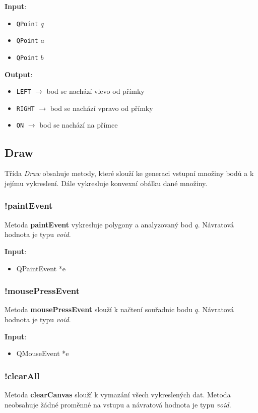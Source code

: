 \documentclass[a4paper, 12pt]{article}
\begin{document}
\textbf{Input}:
\begin{itemize}
\item \texttt{QPoint} $q$
\item \texttt{QPoint} $a$
\item \texttt{QPoint} $b$
\end{itemize}

\textbf{Output}:
\begin{itemize}
\item \texttt{LEFT} $\rightarrow$ bod se nachází vlevo od přímky
\item \texttt{RIGHT} $\rightarrow$ bod se nachází vpravo od přímky
\item \texttt{ON} $\rightarrow$ bod se nachází na přímce
\end{itemize}

\subsection{Draw}
Třída \textit{Draw} obsahuje metody, které slouží ke generaci vstupní množiny bodů a k jejímu vykreslení. Dále vykresluje konvexní obálku dané množiny. 

\subsubsection{!paintEvent}
Metoda \textbf{paintEvent} vykresluje polygony a analyzovaný bod $q$. Návratová hodnota je typu \textit{void}.

\textbf{Input}:
\begin{itemize}
\item QPaintEvent *e
\end{itemize}

\subsubsection{!mousePressEvent}
Metoda \textbf{mousePressEvent} slouží k načtení souřadnic bodu $q$. Návratová hodnota je typu \textit{void}.

\textbf{Input}:
\begin{itemize}
\item QMouseEvent *e
\end{itemize}

\subsubsection{!clearAll}
Metoda \textbf{clearCanvas} slouží k vymazání všech vykreslených dat. Metoda neobsahuje žádné proměnné na vstupu a návratová hodnota je typu \textit{void}.
\end{document}
